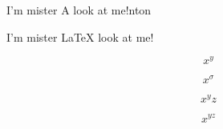 \documentclass{article}
\newcommand{\lookAtMe}[1]{\vbox{I'm mister #1 look at me!}}
\begin{document}
\vspace*{\fill}\vspace{-5ex}

\lookAtMe Anton

\lookAtMe\LaTeX

$$x^y$$

$$x^\sigma $$

$$x^yz$$

$$x^{yz}$$

\vspace*{\fill}
\end{document}
